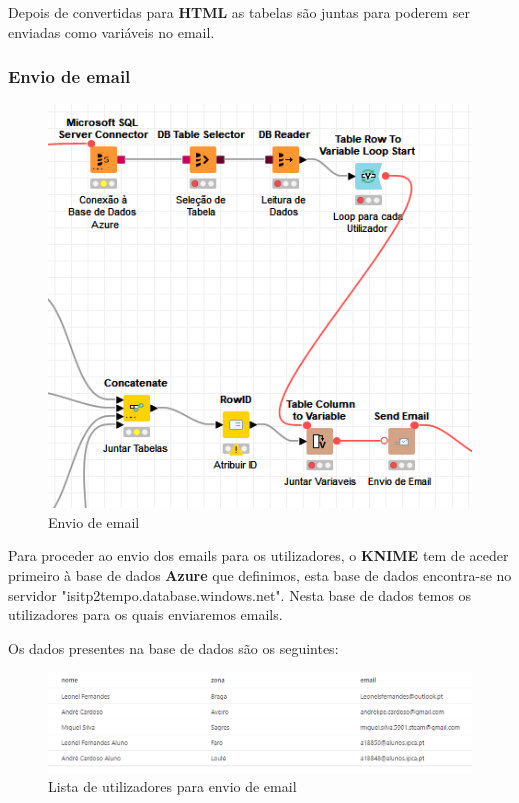 Depois de convertidas para \textbf{HTML} as tabelas são juntas para poderem ser enviadas como variáveis no email.

\subsubsection{Envio de email}

\begin{figure}[H]
    \centering
    \includegraphics{imagens/SendemailSendEmail.png}
    \caption{Envio de email}
\end{figure}

Para proceder ao envio dos emails para os utilizadores, o \textbf{KNIME} tem de aceder primeiro à base de dados \textbf{Azure} que definimos, esta base de dados encontra-se no servidor "isitp2tempo.database.windows.net". Nesta base de dados temos os utilizadores para os quais enviaremos emails.

\newpage
Os dados presentes na base de dados são os seguintes:

\begin{figure}[H]
    \centering
    \includegraphics[scale=0.6]{imagens/Users.png}
    \caption{Lista de utilizadores para envio de email}
\end{figure}

